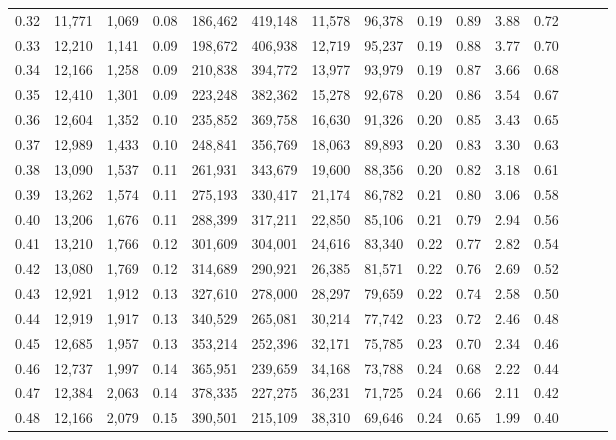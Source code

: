 \begin{tabular}{rrrrrrrrrrrrrrr}
0.32 &  11,771 &  1,069 &  0.08 &  186,462 &  419,148 &   11,578 &   96,378 &  0.19 &  0.89 &  3.88 &      0.72 \\
0.33 &  12,210 &  1,141 &  0.09 &  198,672 &  406,938 &   12,719 &   95,237 &  0.19 &  0.88 &  3.77 &      0.70 \\
0.34 &  12,166 &  1,258 &  0.09 &  210,838 &  394,772 &   13,977 &   93,979 &  0.19 &  0.87 &  3.66 &      0.68 \\
0.35 &  12,410 &  1,301 &  0.09 &  223,248 &  382,362 &   15,278 &   92,678 &  0.20 &  0.86 &  3.54 &      0.67 \\
0.36 &  12,604 &  1,352 &  0.10 &  235,852 &  369,758 &   16,630 &   91,326 &  0.20 &  0.85 &  3.43 &      0.65 \\
0.37 &  12,989 &  1,433 &  0.10 &  248,841 &  356,769 &   18,063 &   89,893 &  0.20 &  0.83 &  3.30 &      0.63 \\
0.38 &  13,090 &  1,537 &  0.11 &  261,931 &  343,679 &   19,600 &   88,356 &  0.20 &  0.82 &  3.18 &      0.61 \\
0.39 &  13,262 &  1,574 &  0.11 &  275,193 &  330,417 &   21,174 &   86,782 &  0.21 &  0.80 &  3.06 &      0.58 \\
0.40 &  13,206 &  1,676 &  0.11 &  288,399 &  317,211 &   22,850 &   85,106 &  0.21 &  0.79 &  2.94 &      0.56 \\
0.41 &  13,210 &  1,766 &  0.12 &  301,609 &  304,001 &   24,616 &   83,340 &  0.22 &  0.77 &  2.82 &      0.54 \\
0.42 &  13,080 &  1,769 &  0.12 &  314,689 &  290,921 &   26,385 &   81,571 &  0.22 &  0.76 &  2.69 &      0.52 \\
0.43 &  12,921 &  1,912 &  0.13 &  327,610 &  278,000 &   28,297 &   79,659 &  0.22 &  0.74 &  2.58 &      0.50 \\
0.44 &  12,919 &  1,917 &  0.13 &  340,529 &  265,081 &   30,214 &   77,742 &  0.23 &  0.72 &  2.46 &      0.48 \\
0.45 &  12,685 &  1,957 &  0.13 &  353,214 &  252,396 &   32,171 &   75,785 &  0.23 &  0.70 &  2.34 &      0.46 \\
0.46 &  12,737 &  1,997 &  0.14 &  365,951 &  239,659 &   34,168 &   73,788 &  0.24 &  0.68 &  2.22 &      0.44 \\
0.47 &  12,384 &  2,063 &  0.14 &  378,335 &  227,275 &   36,231 &   71,725 &  0.24 &  0.66 &  2.11 &      0.42 \\
0.48 &  12,166 &  2,079 &  0.15 &  390,501 &  215,109 &   38,310 &   69,646 &  0.24 &  0.65 &  1.99 &      0.40 \\

\end{tabular}
